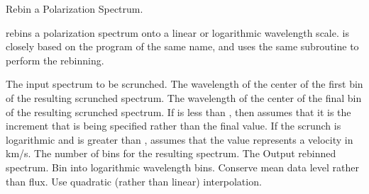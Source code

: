 \begin{manroutinedescription}
        Rebin a Polarization Spectrum.

        {} rebins a polarization spectrum onto a linear or
        logarithmic wavelength scale. {} is closely based on
        the {} program of the same name, and uses the same
        subroutine to perform the rebinning.

\begin{manparametertable}
  The input spectrum %
to be scrunched.
     The wavelength of the center %
of the first
                               bin of the resulting scrunched spectrum.
     The wavelength of the center %
of the final
                               bin of the resulting scrunched spectrum.
                               If {} is less than {}, %
then {}
                               assumes that it is the increment that is
                               being specified rather than the final value.
                               If the scrunch is logarithmic and {}
                               is greater than {}, {%
} assumes that
                               the {} value represents a velocity in
                               km/s.
  The number of bins for the %
resulting spectrum.
  The Output %
rebinned spectrum.
  Bin into logarithmic wavelength %
bins.
  Conserve mean data level rather %
than flux.
  Use quadratic (rather than %
linear)
                               interpolation.


\end{manparametertable}
\end{manroutinedescription}

